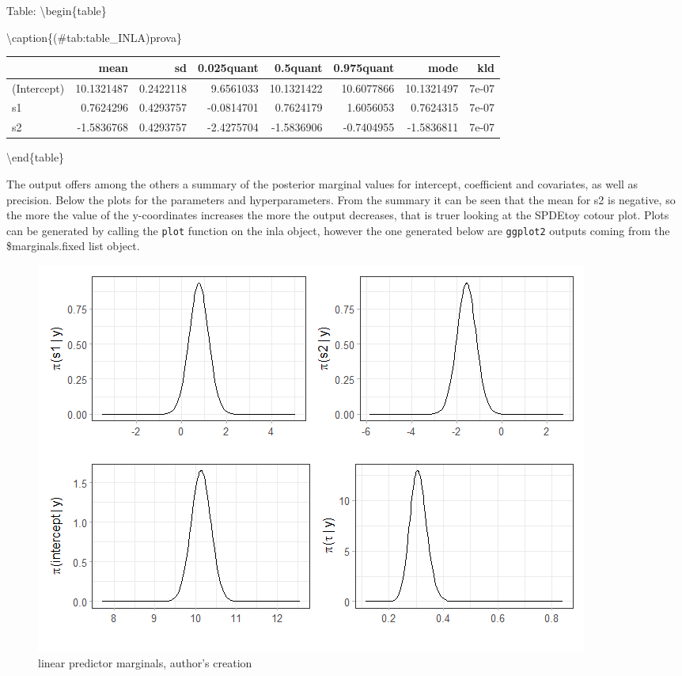 \documentclass[
  12pt,
  a4paper,
  oneside]{book}
\begin{document}
Table: \label{tab:foo}
\textbackslash begin\{table\}

\textbackslash caption\{(\#tab:table\_INLA)prova\}
\centering

\begin{tabular}[t]{lrrrrrrr}
\toprule
  & mean & sd & 0.025quant & 0.5quant & 0.975quant & mode & kld\\
\midrule
(Intercept) & 10.1321487 & 0.2422118 & 9.6561033 & 10.1321422 & 10.6077866 & 10.1321497 & 7e-07\\
s1 & 0.7624296 & 0.4293757 & -0.0814701 & 0.7624179 & 1.6056053 & 0.7624315 & 7e-07\\
s2 & -1.5836768 & 0.4293757 & -2.4275704 & -1.5836906 & -0.7404955 & -1.5836811 & 7e-07\\
\bottomrule
\end{tabular}

\textbackslash end\{table\}

The output offers among the others a summary of the posterior marginal values for intercept, coefficient and covariates, as well as precision. Below the plots for the parameters and hyperparameters. From the summary it can be seen that the mean for s2 is negative, so the more the value of the y-coordinates increases the more the output decreases, that is truer looking at the SPDEtoy cotour plot. Plots can be generated by calling the \texttt{plot} function on the inla object, however the one generated below are \texttt{ggplot2} outputs coming from the \$marginals.fixed list object.

\begin{figure}
\centering
\includegraphics{images/marginal_distr.png}
\caption{linear predictor marginals, author's creation}
\end{figure}
\end{document}
